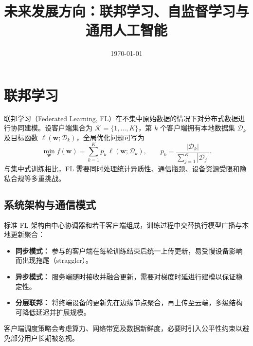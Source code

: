 \documentclass[UTF8,zihao=-4]{ctexart}
\title{未来发展方向：联邦学习、自监督学习与通用人工智能}
\author{}
\date{\today}
\begin{document}
\maketitle
\tableofcontents
\FloatBarrier

\section{联邦学习}
联邦学习（Federated Learning, FL）在不集中原始数据的情况下对分布式数据进行协同建模。设客户端集合为 $\mathcal{K}=\{1,\ldots,K\}$，第 $k$ 个客户端拥有本地数据集 $\mathcal{D}_k$ 及目标函数 $\ell(\mathbf{w};\mathcal{D}_k)$，全局优化问题可写为
\begin{equation}
  \min_{\mathbf{w}} f(\mathbf{w}) = \sum_{k=1}^{K} p_k \, \ell(\mathbf{w}; \mathcal{D}_k), \qquad p_k = \frac{|\mathcal{D}_k|}{\sum_{j=1}^{K} |\mathcal{D}_j|}.
\end{equation}
与集中式训练相比，FL 需要同时处理统计异质性、通信瓶颈、设备资源受限和隐私合规等多重挑战。

\subsection{系统架构与通信模式}
标准 FL 架构由中心协调器和若干客户端组成，训练过程中交替执行模型广播与本地更新聚合：
\begin{itemize}
  \item \textbf{同步模式：} 参与的客户端在每轮训练结束后统一上传更新，易受慢设备影响而出现拖尾（straggler）。
  \item \textbf{异步模式：} 服务端随时接收并融合更新，需要对梯度时延进行建模以保证稳定性。
  \item \textbf{分层联邦：} 将终端设备的更新先在边缘节点聚合，再上传至云端，多级结构可降低延迟并扩展规模。
\end{itemize}
客户端调度策略会考虑算力、网络带宽及数据新鲜度，必要时引入公平性约束以避免部分用户长期被忽视。
\end{document}
